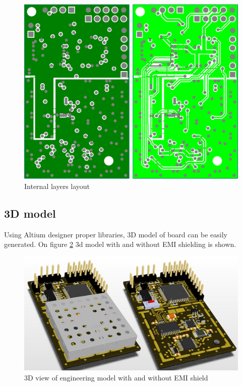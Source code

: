         \begin{figure}[H]
            \centering
            \includegraphics[width=0.6\paperwidth]{img/06/internal_layers_layout.eps}
            \caption{Internal layers layout}
            \label{internal_layers_layout}
        \end{figure}

    \subsection{3D model}
        Using Altium designer proper libraries, 3D model of board can be easily generated. On figure \ref{pcb_3d_model} 3d model with and without EMI shielding is shown.

        \begin{figure}[H]
            \centering
            \includegraphics[width=0.8\paperwidth]{img/06/pcb_3d_model.png}
            \caption{3D view of engineering model with and without EMI shield}
            \label{pcb_3d_model}
        \end{figure}

